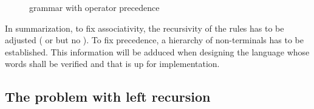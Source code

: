 %

\begin{figure}
	\centering
	
	

	\caption{grammar with operator precedence}
	\label{fig:grammar_example_ambPrecFixed}
\end{figure}

%		
%

In summarization, to fix associativity, the recursivity of the rules has to be adjusted ( or  but no ). To fix precedence, a hierarchy of non-terminals has to be established. This information will be adduced when designing the language whose words shall be verified and that is up for implementation.

\FloatBarrier
\subsection{The problem with left recursion}

